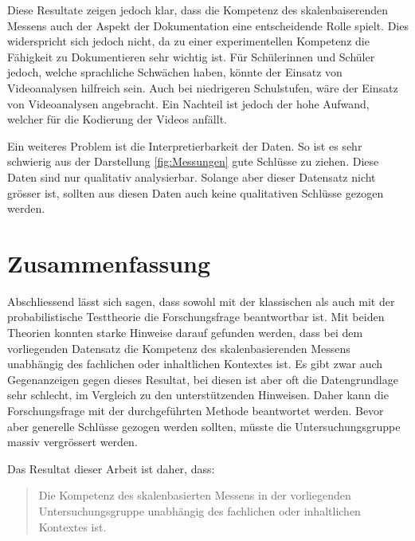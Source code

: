 Diese Resultate zeigen jedoch klar, dass die Kompetenz des skalenbaiserenden Messens auch der Aspekt der Dokumentation eine entscheidende Rolle spielt. Dies widerspricht sich jedoch nicht, da zu einer experimentellen Kompetenz die Fähigkeit zu Dokumentieren sehr wichtig ist. Für Schülerinnen und Schüler jedoch, welche sprachliche Schwächen haben, könnte der Einsatz von Videoanalysen hilfreich sein. Auch bei niedrigeren Schulstufen, wäre der Einsatz von Videoanalysen angebracht. Ein Nachteil ist jedoch der hohe Aufwand, welcher für die Kodierung der Videos anfällt. 

Ein weiteres Problem ist die Interpretierbarkeit der Daten. So ist es sehr schwierig aus der Darstellung \ref{fig:Messungen} gute Schlüsse zu ziehen. Diese Daten sind nur qualitativ analysierbar. Solange aber dieser Datensatz nicht grösser ist, sollten aus diesen Daten auch keine qualitativen Schlüsse gezogen werden.

\section{Zusammenfassung}

Abschliessend lässt sich sagen, dass sowohl mit der klassischen als auch mit der probabilistische Testtheorie die Forschungsfrage beantwortbar ist. Mit beiden Theorien konnten starke Hinweise darauf gefunden werden, dass bei dem vorliegenden Datensatz die Kompetenz des skalenbasierenden Messens unabhängig des fachlichen oder inhaltlichen Kontextes ist. Es gibt zwar auch Gegenanzeigen gegen dieses Resultat, bei diesen ist aber oft die Datengrundlage sehr schlecht, im Vergleich zu den unterstützenden Hinweisen. Daher kann die Forschungsfrage mit der durchgeführten Methode beantwortet werden. Bevor aber generelle Schlüsse gezogen werden sollten, müsste die Untersuchungsgruppe massiv vergrössert werden. 

Das Resultat dieser Arbeit ist daher, dass:
\begin{quote}
 Die Kompetenz des skalenbasierten Messens in der vorliegenden Untersuchungsgruppe unabhängig des fachlichen oder inhaltlichen Kontextes ist.
\end{quote}


